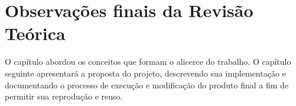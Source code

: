 \section{Observações finais da Revisão Teórica}
{ O capítulo abordou os conceitos que formam o alicerce do trabalho. O capítulo
    seguinte apresentará a proposta do projeto, descrevendo sua implementação
    e documentando o processo de execução e modificação do produto final a fim
    de permitir sua reprodução e reuso.
}

